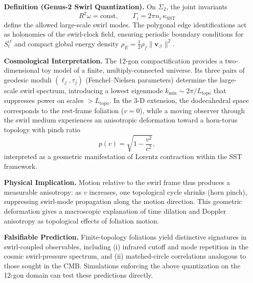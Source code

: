 \documentclass[10pt,reprint,aps,onecolumn,nofootinbib]{revtex4-2}
\begin{document}
    \vspace{0.5em}
    \noindent
    \textbf{Definition (Genus-2 Swirl Quantization).}
    On $\Sigma_2$, the joint invariants
    \begin{equation}
    R^2\omega = \mathrm{const},
    \qquad
    \Gamma_i = 2\pi n_i\,\kappa_{\text{SST}}
    \end{equation}
    define the allowed large-scale swirl modes.  The polygonal edge identifications act as
    holonomies of the swirl-clock field, ensuring periodic boundary conditions for
    $S_t^{\boldsymbol{\circlearrowleft}}$ and compact global energy density
    $\rho_{\!E}=\tfrac{1}{2}\rho_{\!f}\lVert\mathbf v_{\!\boldsymbol{\circlearrowleft}}\rVert^2$.

    \vspace{0.5em}
    \noindent
    \textbf{Cosmological Interpretation.}
    The 12-gon compactification provides a two-dimensional toy model of a finite,
    multiply-connected universe.  Its three pairs of geodesic moduli $(\ell_j,\tau_j)$
    (Fenchel–Nielsen parameters) determine the large-scale swirl spectrum, introducing a
    lowest eigenmode $k_{\min}\!\sim\!2\pi/L_{\text{topo}}$ that suppresses power on scales
    $>\!L_{\text{topo}}$.  In the 3-D extension, the dodecahedral space corresponds to the
    rest-frame foliation ($v\!=\!0$), while a moving observer through the swirl medium
    experiences an anisotropic deformation toward a horn-torus topology with
    pinch ratio
    \begin{equation}
    p(v)=\sqrt{1-\frac{v^2}{c^2}},
    \end{equation}
    interpreted as a geometric manifestation of Lorentz contraction within the SST
    framework.

    \vspace{0.5em}
    \noindent
    \textbf{Physical Implication.}
    Motion relative to the swirl frame thus produces a measurable anisotropy:
    as $v$ increases, one topological cycle shrinks (horn pinch), suppressing
    swirl-mode propagation along the motion direction.
    This geometric deformation gives a macroscopic explanation of time dilation and
    Doppler anisotropy as topological effects of foliation motion.

    \vspace{0.5em}
    \noindent
    \textbf{Falsifiable Prediction.}
    Finite-topology foliations yield distinctive signatures in swirl-coupled observables,
    including (i) infrared cutoff and mode repetition in the cosmic swirl-pressure spectrum,
    and (ii) matched-circle correlations analogous to those sought in the CMB.
    Simulations enforcing the above quantization on the 12-gon domain can test these
    predictions directly.
\end{document}
